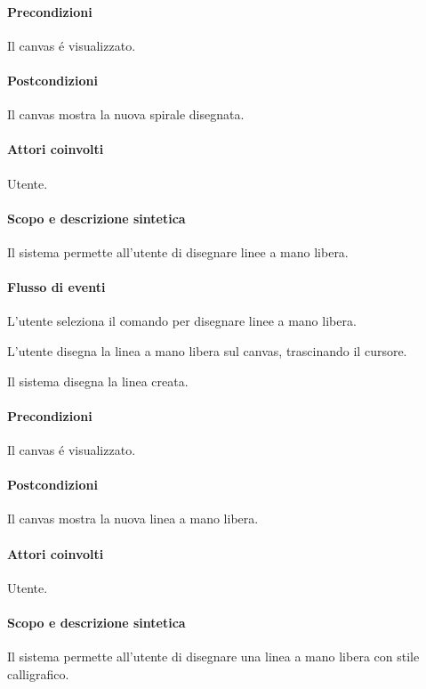 \paragraph{Precondizioni} Il canvas \'e visualizzato.
\paragraph{Postcondizioni} Il canvas mostra la nuova spirale disegnata.

\paragraph{Attori coinvolti} Utente.
\paragraph{Scopo e descrizione sintetica} 
Il sistema permette all'utente di disegnare linee a mano libera.
\paragraph{Flusso di eventi}
\begin{elenconumerato}[\textbf{}]{\subsubsecindent}
\item L'utente seleziona il comando per disegnare linee a mano libera.
\item L'utente disegna la linea a mano libera sul canvas, trascinando il cursore.
\item Il sistema disegna la linea creata.
\end{elenconumerato}
\paragraph{Precondizioni} Il canvas \'e visualizzato.
\paragraph{Postcondizioni} Il canvas mostra la nuova linea a mano libera.

\paragraph{Attori coinvolti} Utente.
\paragraph{Scopo e descrizione sintetica} 
Il sistema permette all'utente di disegnare una linea a mano libera con stile calligrafico.
